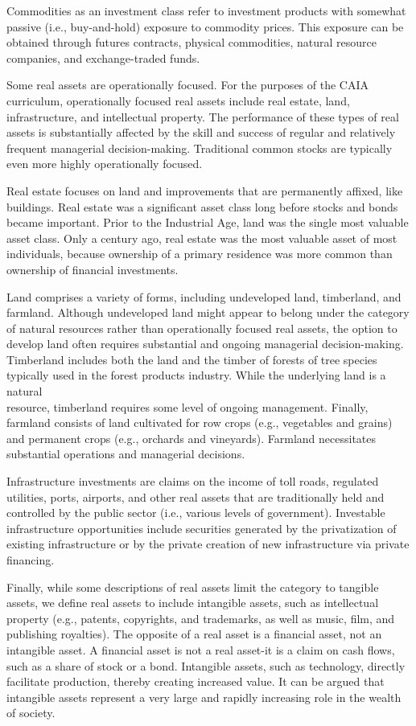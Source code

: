 \documentclass[11pt]{article}
\begin{document}
Commodities as an investment class refer to investment products with somewhat passive (i.e., buy-and-hold) exposure to commodity prices. This exposure can be obtained through futures contracts, physical commodities, natural resource companies, and exchange-traded funds.

Some real assets are operationally focused. For the purposes of the CAIA curriculum, operationally focused real assets include real estate, land, infrastructure, and intellectual property. The performance of these types of real assets is substantially affected by the skill and success of regular and relatively frequent managerial decision-making. Traditional common stocks are typically even more highly operationally focused.

Real estate focuses on land and improvements that are permanently affixed, like buildings. Real estate was a significant asset class long before stocks and bonds became important. Prior to the Industrial Age, land was the single most valuable asset class. Only a century ago, real estate was the most valuable asset of most individuals, because ownership of a primary residence was more common than ownership of financial investments.

Land comprises a variety of forms, including undeveloped land, timberland, and farmland. Although undeveloped land might appear to belong under the category of natural resources rather than operationally focused real assets, the option to develop land often requires substantial and ongoing managerial decision-making. Timberland includes both the land and the timber of forests of tree species typically used in the forest products industry. While the underlying land is a natural\\
resource, timberland requires some level of ongoing management. Finally, farmland consists of land cultivated for row crops (e.g., vegetables and grains) and permanent crops (e.g., orchards and vineyards). Farmland necessitates substantial operations and managerial decisions.

Infrastructure investments are claims on the income of toll roads, regulated utilities, ports, airports, and other real assets that are traditionally held and controlled by the public sector (i.e., various levels of government). Investable infrastructure opportunities include securities generated by the privatization of existing infrastructure or by the private creation of new infrastructure via private financing.

Finally, while some descriptions of real assets limit the category to tangible assets, we define real assets to include intangible assets, such as intellectual property (e.g., patents, copyrights, and trademarks, as well as music, film, and publishing royalties). The opposite of a real asset is a financial asset, not an intangible asset. A financial asset is not a real asset-it is a claim on cash flows, such as a share of stock or a bond. Intangible assets, such as technology, directly facilitate production, thereby creating increased value. It can be argued that intangible assets represent a very large and rapidly increasing role in the wealth of society.
\end{document}
